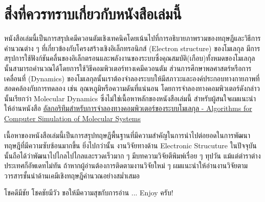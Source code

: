 
{

\chapter*{\centering สิ่งที่ควรทราบเกี่ยวกับหนังสือเล่มนี้}

หนังสือเล่มนี้เป็นการสรุปเคมีควอนตัมเชิงเทคนิคโดยเน้นไปที่การอธิบายภาพรวมของทฤษฎีและวิธีการคำนวณต่าง ๆ ที่เกี่ยวข้องกับโครงสร้างเชิงอิเล็กทรอนิกส์ (Electron structure) ของโมเลกุล มีการสรุปการใช้ฟังก์ชันคลื่นของอิเล็กตรอนและพลังงานของระบบซึ่งคุณสมบัติ(เกือบ)ทั้งหมดของโมเลกุลนั้นสามารถคำนวณได้โดยการใช้วิธีคอมพิวเตอร์ทางเคมีควอนตัม ส่วนการศึกษาพลศาสตร์หรือการเคลื่อนที่ (Dynamics) ของโมเลกุลนั้นเราต้องจำลองระบบให้มีสภาวะและองค์ประกอบทางกายภาพที่สอดคล้องกับการทดลอง เช่น อุณหภูมิหรือความดันที่แน่นอน โดยการจำลองทางคอมพิวเตอร์ดังกล่าวนั้นเรียกว่า Molecular Dynamics ซึ่งไม่ใช่เนื้อหาหลักของหนังสือเล่มนี้ สำหรับผู้สนใจผมแนะนำให้อ่านหนังสือ \href{https://rangsimanketkaew.github.io/archive/algo-sim-mol/}{อัลกอริทึมสำหรับการจำลองทางคอมพิวเตอร์ของระบบโมเลกุล - Algorithms for Computer Simulation of Molecular Systems}

เนื้อหาของหนังสือเล่มนี้เป็นการสรุปทฤษฎีพื้นฐานที่มีความสำคัญในการนำไปต่อยอดในการพัฒนาทฤษฎีที่มีความซับซ้อนมากขึ้น ยิ่งไปกว่านั้น งานวิจัยทางด้าน Electronic Strucuture ในปัจจุบันนั้นถือได้ว่าพัฒนาไปไกลไปไกลและรวดเร็วมาก ๆ มีบทความวิจัยตีพิมพ์เรื่อย ๆ ทุปวัน แม้แต่ตำราต่างประเทศก็อัพเดทไม่ทัน ถ้าหากผู้อ่านต้องการติดตามงานวิจัยใหม่ ๆ ผมแนะนำให้อ่านงานวิจัยตามวารสารชั้นนำด้านเคมีเชิงทฤษฎีคำนวณอย่างสม่ำเสมอ

โชคดีมีชัย โชคชัยมีวัว \quad ขอให้มีความสุขกับการอ่าน ... Enjoy ครับ!

}
